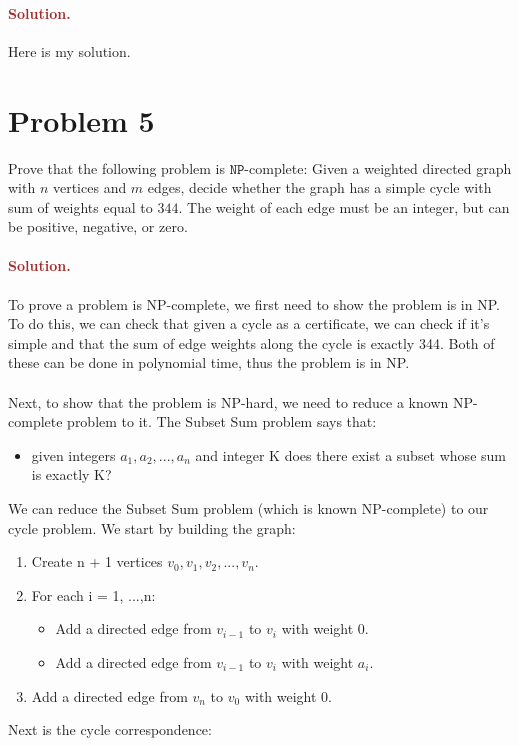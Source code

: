 \paragraph{\textcolor{brown}{Solution.}}
Here is my solution.


\section*{Problem 5}
Prove that the following problem is $\mathtt{NP}$-complete: Given a weighted directed graph with $n$ vertices and $m$ edges, decide whether the graph has a simple cycle with sum of weights equal to $344$. The weight of each edge must be an integer, but can be positive, negative, or zero.

\paragraph{\textcolor{brown}{Solution.}}
To prove a problem is NP-complete, we first need to show the problem is in NP. To do this, we can check that given a cycle as a certificate, we can check if it's simple and that the sum of edge weights along the cycle is exactly 344. Both of these can be done in polynomial time, thus the problem is in NP. 
\\ \\ Next, to show that the problem is NP-hard, we need to reduce a known NP-complete problem to it. The Subset Sum problem says that: 
\begin{itemize} \item given integers $a_1, a_2, ..., a_n$ and integer K does there exist a subset whose sum is exactly K? \end{itemize}
We can reduce the Subset Sum problem (which is known NP-complete) to our cycle problem. We start by building the graph:
\begin{enumerate} \item Create n + 1 vertices $v_0, v_1, v_2, ..., v_n$. \item For each i = 1, ...,n: \begin{itemize} \item Add a directed edge from $v_{i-1}$ to $v_i$ with weight 0. \item Add a directed edge from $v_{i-1}$ to $v_i$ with weight $a_i$. \end{itemize} \item Add a directed edge from $v_n$ to $v_0$ with weight 0. \end{enumerate}
Next is the cycle correspondence:
